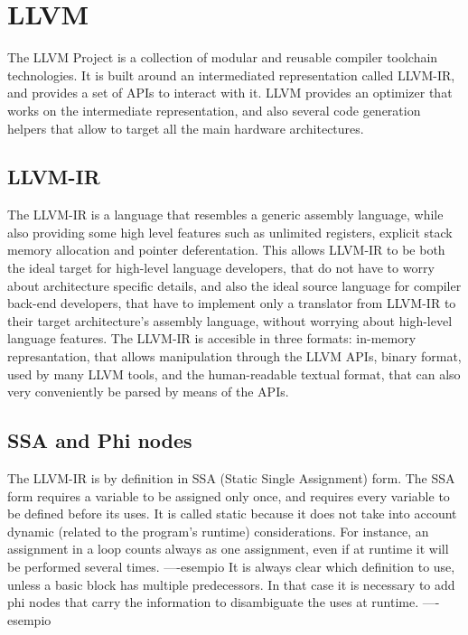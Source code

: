 
\section{LLVM}
The LLVM Project \cite{llvm} is a collection of modular and reusable compiler toolchain technologies. It is built around an intermediated representation called LLVM-IR, and provides a set of APIs to interact with it. LLVM provides an optimizer that works on the intermediate representation, and also several code generation helpers that allow to target all the main hardware architectures.
\subsection{LLVM-IR}
The LLVM-IR is a language that resembles a generic assembly language, while also providing some high level features such as unlimited registers, explicit stack memory allocation and pointer deferentation.
This allows LLVM-IR to be both the ideal target for high-level language developers, that do not have to worry about architecture specific details, and also the ideal source language for compiler back-end developers, that have to implement only a translator from LLVM-IR to their target architecture's assembly language, without worrying about high-level language features.
The LLVM-IR is accesible in three formats: in-memory represantation, that allows manipulation through the LLVM APIs, binary format, used by many LLVM tools, and the human-readable textual format, that can also very conveniently be parsed by means of the APIs.

\subsection{SSA and Phi nodes}
The LLVM-IR is by definition in SSA (Static Single Assignment) form. The SSA form requires a variable to be assigned only once, and requires every variable to be defined before its uses. It is called static because it does not take into account dynamic (related to the program's runtime) considerations. For instance, an assignment in a loop counts always as one assignment, even if at runtime it will be performed several times.\newline
----esempio \newline
It is always clear which definition to use, unless a basic block has multiple predecessors. In that case it is necessary to add phi nodes that carry the information to disambiguate the uses at runtime.\newline
----esempio
\newline

